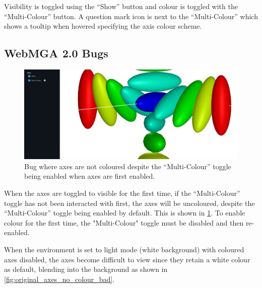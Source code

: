 Visibility is toggled using the ``Show'' button and colour is toggled with the ``Multi-Colour'' button. A question mark icon is next to the ``Multi-Colour'' which shows a tooltip when hovered specifying the axis colour scheme.

\subsection{WebMGA 2.0 Bugs}
\begin{figure}
  \begin{center}
    \includegraphics[width=\linewidth]{assets/images/axes/2_bug}
    \caption{\centering Bug where axes are not coloured despite the ``Multi-Colour'' toggle being enabled when axes are first enabled.}
    \label{fig:original_bug}
  \end{center}
\end{figure}

When the axes are toggled to visible for the first time, if the ``Multi-Colour'' toggle has not been interacted with first, the axes will be uncoloured, despite the ``Multi-Colour'' toggle being enabled by default. This is shown in \cref{fig:original_bug}. To enable colour for the first time, the "Multi-Colour" toggle must be disabled and then re-enabled.

When the environment is set to light mode (white background) with coloured axes disabled, the axes become difficult to view since they retain a white colour as default, blending into the background as shown in \cref{fig:original_axes_no_colour_bad}.

